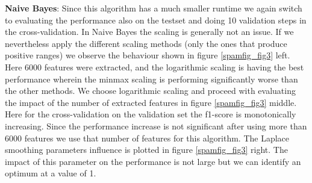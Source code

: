 \documentclass[11pt]{article}
\begin{document}
\textbf{Naive Bayes}:
Since this algorithm has a much smaller runtime we again switch to evaluating the performance also on the testset and doing 10 validation steps in the cross-validation. In Naive Bayes the scaling is generally not an issue. If we nevertheless apply the different scaling methods (only the ones that produce positive ranges) we observe the behaviour shown in figure \ref{spamfig_fig3} left. Here 6000 features were extracted, and the logarithmic scaling is having the best performance wherein the minmax scaling is performing significantly worse than the other methods. We choose logarithmic scaling and proceed with evaluating the impact of the number of extracted features in figure \ref{spamfig_fig3} middle. Here for the cross-validation on the validation set the f1-score is monotonically increasing. Since the performance increase is not significant after using more than 6000 features we use that number of features for this algorithm. The Laplace smoothing parameters influence is plotted in figure \ref{spamfig_fig3} right. The impact of this parameter on the performance is not large but we can identify an optimum at a value of 1.
\end{document}
